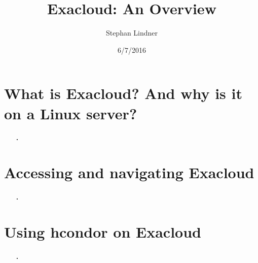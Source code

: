 \documentclass[12pt,t,xcolor=table]{beamer}
\author{Stephan Lindner}
\date{6/7/2016}
\title{Exacloud: An Overview}
\begin{document}
\maketitle

\section{What is Exacloud? And why is it on a Linux server?}
\label{sec:orgheadline1}
\begin{frame}[c]{}
  \begin{itemize}
    \item[\bf\thesection.] \bf\insertsection
  \end{itemize}          
\end{frame}

\section{Accessing and navigating Exacloud}
\label{sec:orgheadline1}
\begin{frame}[c]{}
  \begin{itemize}
    \item[\bf\thesection.] \bf\insertsection
  \end{itemize}          
\end{frame}

\section{Using hcondor on Exacloud}
\label{sec:orgheadline1}
\begin{frame}[c]{}
  \begin{itemize}
    \item[\bf\thesection.] \bf\insertsection
  \end{itemize}          
\end{frame}
\end{document}
